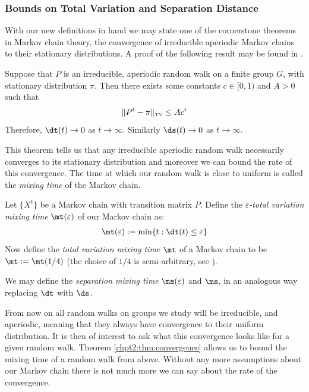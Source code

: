 \documentclass[11pt]{report}
\begin{document}
\subsubsection{Bounds on Total Variation and Separation Distance}

With our new definitions in hand we may state one of the cornerstone theorems 
in Markov chain theory, the convergence of irreducible aperiodic Markov chains to their stationary distributions. A proof of the following result may be found in \cite[Theorem 4.9]{Levin2017}.

\begin{thm}
	\label{chpt2:thm:convergence}
	Suppose that $P$ is an irreducible, aperiodic random walk on a finite group $G$, with 
	stationary distribution $\pi$. Then there exists some constants $c \in 
	[0,1)$ and 
	$A>0$ such that
	\begin{eqnarray}
	\lVert P^{t} - \pi 
	\rVert_{\textnormal{\tiny TV}} 
	\leq A c^{t}
	\end{eqnarray}
	Therefore, $\dt(t) \to 0 $ as 
	$t\to\infty$. Similarly $\ds(t) \to 0 $ as $t \to 
	\infty$.
\end{thm}




This theorem tells us that any irreducible aperiodic random walk 
necessarily converges to its stationary distribution and 
moreover we can bound the rate of this convergence. The time at which our 
random walk is close to uniform is called the \emph{mixing time} of the Markov 
chain.

\begin{defn}
	\label{chpt2:def:mixingtime}
	Let $\{X^{t}\}$ be a Markov chain with transition matrix $P$. Define the \emph{$\varepsilon$-total variation mixing time}
	$\mt(\varepsilon)$ of our Markov chain as:
	\begin{eqnarray}
	\mt(\varepsilon) := \min \{t : \dt(t) \leq \varepsilon\}
	\end{eqnarray}
	Now define the \emph{total variation mixing time} $\mt$ of a Markov chain to be 
	$\mt:=\mt(1/4)$ (the choice of $1/4$ is semi-arbitrary, see \cite[Section 4.5]{Levin2017}).
	
	We may define the \emph{separation mixing time} $\ms(\varepsilon)$ and $\ms$, 
	in an analogous way replacing $\dt$ with $\ds$.
\end{defn}






From now on all random walks on groups we study will be irreducible, and aperiodic, meaning that they always have convergence to their uniform distribution. It is then of interest to ask what this convergence looks like for a given random walk.
Theorem \ref{chpt2:thm:convergence} allows us to bound the mixing time of a random walk from 
above. Without any more assumptions about our Markov chain there is not much 
more we can say about the rate of the convergence. 
\end{document}

